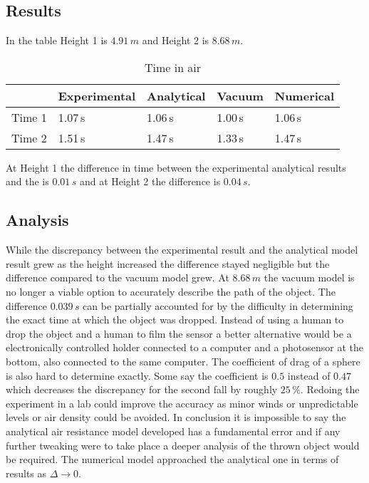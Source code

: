 \documentclass[%
aip,
jmp,
amsmath,amssymb,
reprint,%
]{revtex4-1}
\newcommand\Tstrut{\rule{0pt}{2.6ex}}
\newcommand\Bstrut{\rule[-0.9ex]{0pt}{0pt}}
\newcommand{\TBstrut}{\Tstrut\Bstrut}
\begin{document}
	\subsection{Results}
	In the table Height 1 is $4.91\,m$ and Height 2 is $8.68\,m$.
	\begin{table}[H]
		\centering
		\caption{Time in air}
		\label{table-3-label}
		\begin{tabular}{@{}lllll@{}}
			\hline
			& Experimental & Analytical & Vacuum & Numerical \TBstrut\\
			\hline
			Time 1 & 1.07\,s        & 1.06\,s      & 1.00\,s  & 1.06\,s    \TBstrut\\
			Time 2 & 1.51\,s        & 1.47\,s      & 1.33\,s  & 1.47\,s     \TBstrut\\ \hline
		\end{tabular}
	\end{table}
	At Height 1 the difference in time between the experimental analytical results and the is $0.01\,s$ and at Height 2 the difference is $0.04\,s$.
	\subsection{Analysis}
	While the discrepancy between the experimental result and the analytical model result grew as the height increased the difference stayed negligible but the difference compared to the vacuum model grew. At $8.68\,m$ the vacuum model is no longer a viable option to accurately describe the path of the object. The difference $0.039\,s$ can be partially accounted for by the difficulty in determining the exact time at which the object was dropped. Instead of using a human to drop the object and a human to film the sensor a better alternative would be a electronically controlled holder connected to a computer and a photosensor at the bottom, also connected to the same computer. The coefficient of drag of a sphere is also hard to determine exactly. Some\cite{c_d} say the coefficient is $0.5$ instead of $0.47$ which decreases the discrepancy for the second fall by roughly $25\,\%$. Redoing the experiment in a lab could improve the accuracy as minor winds or unpredictable levels or air density could be avoided. In conclusion it is impossible to say the analytical air resistance model developed has a fundamental error and if any further tweaking were to take place a deeper analysis of the thrown object would be required. The numerical model approached the analytical one in terms of results as $\Delta \rightarrow 0$.
\end{document}
